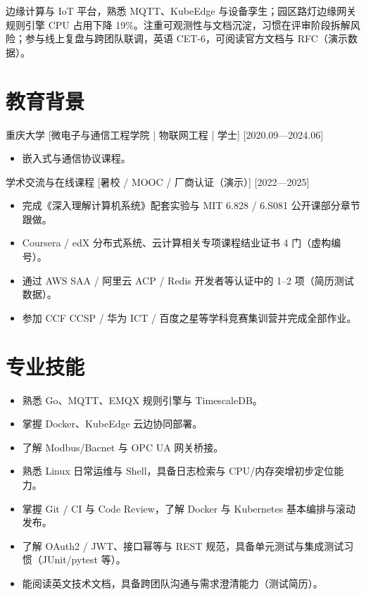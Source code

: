 \documentclass{resume-photo}
\begin{document}

\ResumeTitle

\noindent 边缘计算与 IoT 平台，熟悉 MQTT、KubeEdge 与设备孪生；园区路灯边缘网关规则引擎 CPU 占用下降 19\%。注重可观测性与文档沉淀，习惯在评审阶段拆解风险；参与线上复盘与跨团队联调，英语 CET-6，可阅读官方文档与 RFC（演示数据）。

\section{教育背景}
\ResumeItem
{重庆大学}
[\textnormal{微电子与通信工程学院 | 物联网工程 | 学士}]
[2020.09—2024.06]

\begin{itemize}
  \item 嵌入式与通信协议课程。
\end{itemize}


\ResumeItem
{学术交流与在线课程}
[\textnormal{暑校 / MOOC / 厂商认证（演示）}]
[2022—2025]

\begin{itemize}
  \item 完成《深入理解计算机系统》配套实验与 MIT 6.828 / 6.S081 公开课部分章节跟做。
  \item Coursera / edX 分布式系统、云计算相关专项课程结业证书 4 门（虚构编号）。
  \item 通过 AWS SAA / 阿里云 ACP / Redis 开发者等认证中的 1--2 项（简历测试数据）。
  \item 参加 CCF CCSP / 华为 ICT / 百度之星等学科竞赛集训营并完成全部作业。
\end{itemize}



\section{专业技能}
\begin{itemize}
  \item 熟悉 Go、MQTT、EMQX 规则引擎与 TimescaleDB。
  \item 掌握 Docker、KubeEdge 云边协同部署。
  \item 了解 Modbus/Bacnet 与 OPC UA 网关桥接。
  \item 熟悉 Linux 日常运维与 Shell，具备日志检索与 CPU/内存突增初步定位能力。
  \item 掌握 Git / CI 与 Code Review，了解 Docker 与 Kubernetes 基本编排与滚动发布。
  \item 了解 OAuth2 / JWT、接口幂等与 REST 规范，具备单元测试与集成测试习惯（JUnit/pytest 等）。
  \item 能阅读英文技术文档，具备跨团队沟通与需求澄清能力（测试简历）。
\end{itemize}
\end{document}

